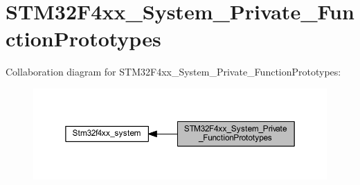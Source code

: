 \hypertarget{group___s_t_m32_f4xx___system___private___function_prototypes}{}\section{S\+T\+M32\+F4xx\+\_\+\+System\+\_\+\+Private\+\_\+\+Function\+Prototypes}
\label{group___s_t_m32_f4xx___system___private___function_prototypes}
Collaboration diagram for S\+T\+M32\+F4xx\+\_\+\+System\+\_\+\+Private\+\_\+\+Function\+Prototypes\+:
\nopagebreak
\begin{figure}[H]
\begin{center}
\leavevmode
\includegraphics[width=350pt]{group___s_t_m32_f4xx___system___private___function_prototypes}
\end{center}
\end{figure}
